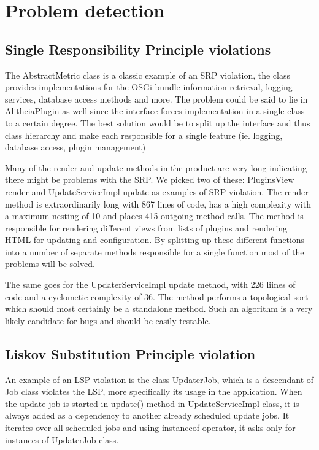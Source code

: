 \documentclass[a4paper,11pt,titlepage]{article}
\begin{document}
\section{Problem detection}

\subsection{Single Responsibility Principle violations}
The AbstractMetric class is a classic example of an SRP violation, the class provides implementations for the OSGi bundle information retrieval, logging services, database access methods and more. The problem could be said to lie in AlitheiaPlugin as well since the interface forces implementation in a single class to a certain degree. The best solution would be to split up the interface and thus class hierarchy and make each responsible for a single feature (ie. logging, database access, plugin management)

Many of the render and update methods in the product are very long indicating there might be problems with the SRP. We picked two of these: PluginsView render and UpdateServiceImpl update as examples of SRP violation. The render method is extraordinarily long with 867 lines of code, has a high complexity with a maximum nesting of 10 and places 415 outgoing method calls. The method is responsible for rendering different views from lists of plugins and rendering HTML for updating and configuration. By splitting up these different functions into a number of separate methods responsible for a single function most of the problems will be solved.

The same goes for the UpdaterServiceImpl update method, with 226 liines of code and a cyclometic complexity of 36. The method performs a topological sort which should most certainly be a standalone method. Such an algorithm is a very likely candidate for bugs and should be easily testable.

\subsection{Liskov Substitution Principle violation}
An example of an LSP violation is the class UpdaterJob, which is a descendant of Job class violates the LSP, more specifically its usage in the application. When the update job is started in update() method in UpdateServiceImpl class, it is always added as a dependency to another already scheduled update jobs. It iterates over all scheduled jobs and using instanceof operator, it asks only for instances of UpdaterJob class.
\end{document}
